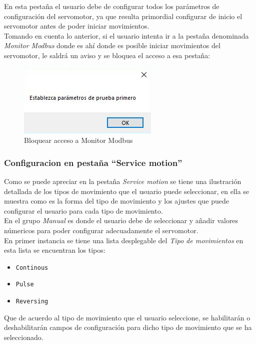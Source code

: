 \documentclass[12pt,titlepage]{article}
\begin{document}
En esta pestaña el usuario debe de configurar todos los parámetros de configuración del servomotor, ya que resulta  primordial  configurar de inicio  el servomotor antes de poder iniciar movimientos. \\ 

Tomando en cuenta lo anterior, si el usuario intenta ir a la pestaña denominada \textit{Monitor Modbus} donde es ahí donde es posible iniciar movimientos del servomotor, le saldrá un aviso y se bloquea el acceso a esa pestaña: \\ 
\begin{figure}[htbp]
\hspace*{5.8cm} 
\includegraphics[scale=0.78]{no_seet_params}
\caption{Bloquear acceso a Monitor Modbus}
\end{figure}
\newpage
\subsubsection{Configuracion en pestaña ``Service motion''}
Como se puede apreciar  en la pestaña \textit{Service motion}  se tiene una ilustración detallada de los tipos de movimiento que el usuario puede seleccionar, en ella se muestra como es la forma del tipo de movimiento y los ajustes que puede configurar el usuario para cada tipo de movimiento. \\ 

En el grupo \textit{Manual} es donde el usuario debe de seleccionar y añadir valores númericos para poder configurar adecuadamente el servomotor. \\

En primer instancia se tiene una lista desplegable del \textit{Tipo de movimientos} en esta lista se encuentran los tipos: \\ 
\begin{itemize}
\item \texttt{Continous}
\item \texttt{Pulse}
\item \texttt{Reversing}
\end{itemize}

Que de acuerdo al tipo de movimiento que el usuario seleccione, se habilitarán o deshabilitarán campos de configuración para dicho tipo de movimiento que se ha seleccionado. \\
\end{document}
